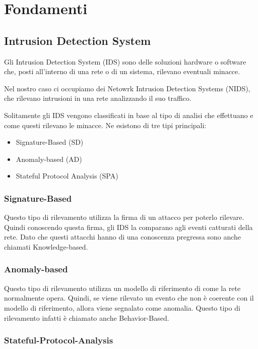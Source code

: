 \chapter{Fondamenti}

\section{Intrusion Detection System}

Gli Intrusion Detection System (IDS) sono delle soluzioni hardware o software che, posti all'interno di una rete o di un sistema, rilevano eventuali minacce. 

Nel nostro caso ci occupiamo dei Netowrk Intrusion Detection Systems (NIDS), che rilevano intrusioni in una rete analizzando il suo traffico.

Solitamente gli IDS vengono classificati in base al tipo di analisi che effettuano e come questi rilevano le minacce. Ne esistono di tre tipi principali:

\begin{itemize}
    \item Signature-Based (SD)
    \item Anomaly-based (AD)
    \item Stateful Protocol Analysis (SPA)
\end{itemize}

\subsection{Signature-Based}

Questo tipo di rilevamento utilizza la firma di un attacco per poterlo rilevare. Quindi conoscendo questa firma, gli IDS la comparano agli eventi catturati della rete. Dato che questi attacchi hanno di una conoscenza pregressa sono anche chiamati Knowledge-based.


\subsection{Anomaly-based}

Questo tipo di rilevamento utilizza un modello di riferimento di come la rete normalmente opera. Quindi, se viene rilevato un evento che non è coerente con il modello di riferimento, allora viene segnalato come anomalia. Questo tipo di rilevamento infatti è chiamato anche Behavior-Based.


\subsection{Stateful-Protocol-Analysis}

